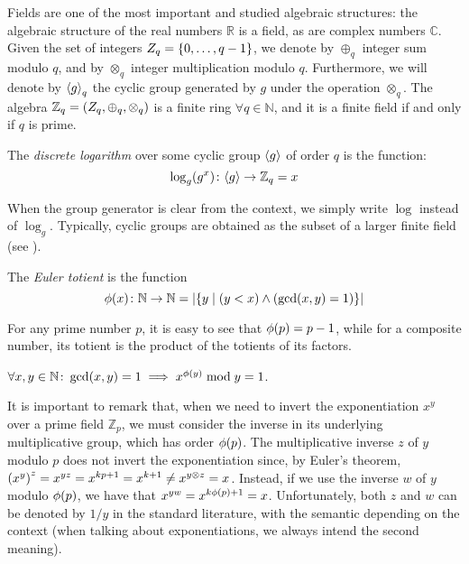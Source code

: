 Fields are one of the most important and studied algebraic structures: the algebraic structure of 
the real numbers \(\mathbb{R}\) is a field, as are complex numbers \(\mathbb{C}\).
Given the set of integers \(Z_q = \Set{0, \dots, q-1}\), we denote by \(\oplus_q\) integer sum 
modulo \(q\), and by \(\otimes_q\) integer multiplication modulo \(q\).
Furthermore, we will denote by \(\gengroup{g}_q\) the cyclic group generated by \(g\) under 
the operation \(\otimes_q\).
The algebra \(\mathbb{Z}_q = \Tuple{Z_q, \oplus_q, \otimes_q}\) is a finite ring 
\(\forall q \in \mathbb{N}\), and it is a finite field if and only if \(q\) is prime.
\begin{definition}
  The \emph{discrete logarithm} over some cyclic group \(\gengroup{g}\) of order \(q\) is the 
  function:
  \[\call{\log_g}{g^x}\colon \gengroup{g} \to \mathbb{Z}_q = x\]
\end{definition}

When the group generator is clear from the context, we simply write \(\log \) instead of \(\log_g\).
Typically, cyclic groups are obtained as the subset of a larger finite field 
(see ). 

\begin{definition}
  The \emph{Euler totient} is the function 
  \[\call{\totient}{x}\colon \mathbb{N} \to \mathbb{N} = \abs{\Set{y \mid \Parens*{y < x} \land \Parens*{\call{\gcd}{x, y} = 1}}}\]
\end{definition}

For any prime number \(p\), it is easy to see that \(\call{\totient}{p} = p - 1\), while for 
a composite number, its totient is the product of the totients of its factors.

\begin{theorem}
  \(\forall x,y \in \mathbb{N}\colon \call{\gcd}{x, y} = 1 \implies x^{\call{\totient}{y}} \bmod y = 1\).
\end{theorem}

It is important to remark that, when we need to invert the exponentiation \(x^y\) over a prime 
field \(\mathbb{Z}_p\), we must consider the inverse in its underlying multiplicative group, which 
has order \(\call{\totient}{p}\). 
The multiplicative inverse \(z\) of \(y\) modulo \(p\) does not invert the exponentiation since, 
by Euler's theorem, \(\Parens*{x^{y}}^{z} = x^{yz} = x^{kp + 1} = x^{k + 1} \neq x^{y \otimes z} = x\).
Instead, if we use the inverse \(w\) of \(y\) modulo \(\call{\totient}{p}\), we have that 
\(x^{yw} = x^{k\call{\totient}{p} + 1} = x\).
Unfortunately, both \(z\) and \(w\) can be denoted by \(1/y\) in the standard literature, with the 
semantic depending on the context (when talking about exponentiations, we always intend the 
second meaning).

